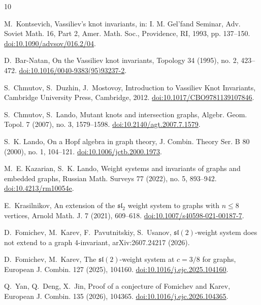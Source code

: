 \documentclass[11pt,a4paper,reqno]{amsart}
\theoremstyle{definition}
\begin{document}
\begin{thebibliography}{10}
\raggedright

M.~Kontsevich, Vassiliev's knot invariants, in: I. M. Gel'fand Seminar, Adv. Soviet Math. 16, Part 2, Amer. Math. Soc., Providence, RI, 1993, pp. 137--150. \href{https://doi.org/10.1090/advsov/016.2/04}{doi:10.1090/advsov/016.2/04}.

D.~Bar-Natan, On the Vassiliev knot invariants, Topology 34 (1995), no. 2, 423--472. \href{https://doi.org/10.1016/0040-9383(95)93237-2}{doi:10.1016/0040-9383(95)93237-2}.

S.~Chmutov, S.~Duzhin, J.~Mostovoy, Introduction to Vassiliev Knot Invariants, Cambridge University Press, Cambridge, 2012. \href{https://doi.org/10.1017/CBO9781139107846}{doi:10.1017/CBO9781139107846}.

S.~Chmutov, S.~Lando, Mutant knots and intersection graphs, Algebr. Geom. Topol. 7 (2007), no. 3, 1579--1598. \href{https://doi.org/10.2140/agt.2007.7.1579}{doi:10.2140/agt.2007.7.1579}.

S.~K. Lando, On a Hopf algebra in graph theory, J. Combin. Theory Ser. B 80 (2000), no. 1, 104--121. \href{https://doi.org/10.1006/jctb.2000.1973}{doi:10.1006/jctb.2000.1973}.

M.~E. Kazarian, S.~K. Lando, Weight systems and invariants of graphs and embedded graphs, Russian Math. Surveys 77 (2022), no. 5, 893--942. \href{https://doi.org/10.4213/rm10054e}{doi:10.4213/rm10054e}.

E.~Krasilnikov, An extension of the $\mathfrak{sl}_2$ weight system to graphs with $n\le8$ vertices, Arnold Math. J. 7 (2021), 609--618. \href{https://doi.org/10.1007/s40598-021-00187-7}{doi:10.1007/s40598-021-00187-7}.

D.~Fomichev, M.~Karev, F.~Pavutnitskiy, S.~Usanov, $\mathfrak{sl}(2)$-weight system does not extend to a graph 4-invariant, arXiv:2607.24217 (2026).

D.~Fomichev, M.~Karev, The $\mathfrak{sl}(2)$-weight system at $c=3/8$ for graphs, European J. Combin. 127 (2025), 104160. \href{https://doi.org/10.1016/j.ejc.2025.104160}{doi:10.1016/j.ejc.2025.104160}.

Q.~Yan, Q.~Deng, X.~Jin, Proof of a conjecture of Fomichev and Karev, European J. Combin. 135 (2026), 104365. \href{https://doi.org/10.1016/j.ejc.2026.104365}{doi:10.1016/j.ejc.2026.104365}.


\end{thebibliography}
\end{document}
